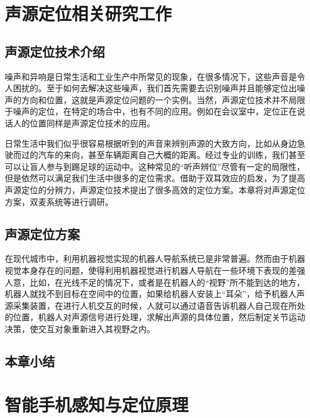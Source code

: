\documentclass[winfonts]{njuthesis}
\begin{document}
\chapter{声源定位相关研究工作}
	\section{声源定位技术介绍}
		
		噪声和异响是日常生活和工业生产中所常见的现象，在很多情况下，这些声音是令人困扰的。至于如何去解决这些噪声，我们首先需要去识别噪声并且能够定位出噪声的方向和位置，这就是声源定位问题的一个实例。当然，声源定位技术并不局限于噪声的定位，在特定的场合中，也有不同的应用。例如在会议室中，定位正在说话人的位置同样是声源定位技术的应用。
		
		日常生活中我们似乎很容易根据听到的声音来辨别声源的大致方向，比如从身边急驶而过的汽车的来向，甚至车辆距离自己大概的距离。经过专业的训练，我们甚至可以让盲人参与到踢足球的运动中。这种常见的“听声辨位”尽管有一定的局限性，但是依然可以满足我们生活中很多的定位需求。借助于双耳效应的启发，为了提高声源定位的分辨力，声源定位技术提出了很多高效的定位方案。本章将对声源定位方案，双麦系统等进行调研。
		
	\section{声源定位方案}
	
		在现代城市中，利用机器视觉实现的机器人导航系统已是非常普遍。然而由于机器视觉本身存在的问题，使得利用机器视觉进行机器人导航在一些环境下表现的差强人意，比如，在光线不足的情况下，或者是在机器人的“视野”所不能到达的地方，机器人就找不到目标在空间中的位置，如果给机器人安装上“耳朵”，给予机器人声源采集装置，在进行人机交互的时候，人就可以通过语音告诉机器人自己现在所处的位置，机器人对声源信号进行处理，求解出声源的具体位置，然后制定关节运动决策，使交互对象重新进入其视野之内。
	
	\section{本章小结}	

\chapter{智能手机感知与定位原理}\label{chapter_mobile}
	
\end{document}
